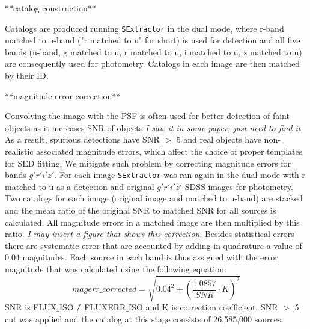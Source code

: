 \documentclass[numberedappendix,apj,twocolumn]{emulateapj}
\begin{document}
**catalog construction**

Catalogs are produced running {\tt SExtractor} in the dual mode, where r-band matched to u-band ("r matched to u" for short) is used for detection and all five bands (u-band, g matched to u, r matched to u, i matched to u, z matched to u) are consequently used for photometry. Catalogs in each image are then matched by their ID.

**magnitude error correction**

Convolving the image with the PSF is often used for better detection of faint objects as it increases SNR of objects \textit{I saw it in some paper, just need to find it}. As a result, spurious detections have SNR $>$ 5 and real objects have non-realistic associated magnitude errors, which affect the choice of proper templates for SED fitting. We mitigate such problem by correcting magnitude errors for bands $g'r'i'z'$. For each image {\tt SExtractor} was ran again in the dual mode with r matched to u as a detection and original $g'r'i'z'$ SDSS images for photometry. Two catalogs for each image (original image and matched to u-band) are stacked and the mean ratio of the original SNR to matched SNR for all sources is calculated. All magnitude errors in a matched image are then multiplied by this ratio. \textit{I may insert a figure that shows this correction}. Besides statistical errors there are systematic error that are accounted by adding in quadrature a value of 0.04 magnitudes. Each source in each band is thus assigned with the error magnitude that was calculated using the following equation:
$$ magerr\_corrected = \sqrt{0.04^{2}+(\dfrac{1.0857}{SNR}\cdot K)^{2}} $$ SNR is FLUX$\_$ISO $ \//$ FLUXERR$\_$ISO and K is correction coefficient. SNR $>$ 5 cut was applied and the catalog at this stage consists of 26,585,000 sources. 
\end{document}
